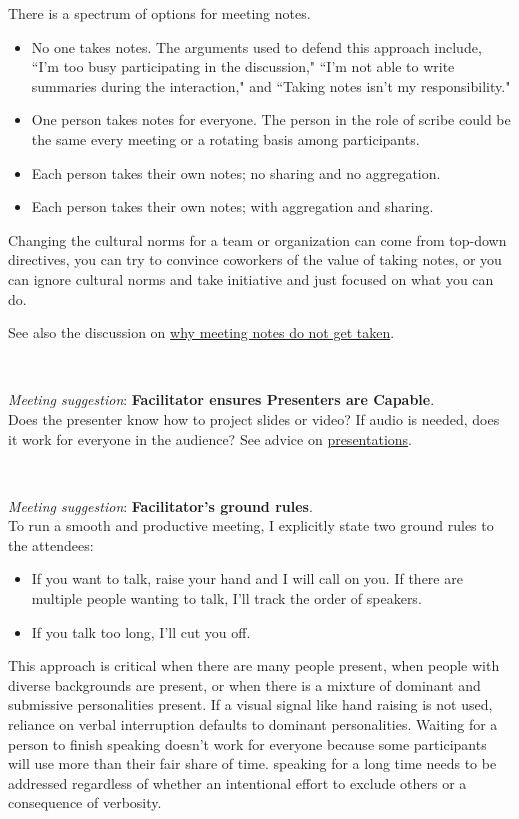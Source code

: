 There is a spectrum of options for meeting notes. 
\begin{itemize}
    \item No one takes notes. The arguments used to defend this approach include, ``I'm too busy participating in the discussion," ``I'm not able to write summaries during the interaction," and ``Taking notes isn't my responsibility."
    \item One person takes notes for everyone. The person in the role of scribe could be the same every meeting or a rotating basis among participants.
    \item Each person takes their own notes; no sharing and no aggregation.
    \item Each person takes their own notes; with aggregation and sharing.
\end{itemize}

Changing the cultural norms for a team or organization can come from top-down directives, you can try to convince coworkers of the value of taking notes, or you can ignore cultural norms and take initiative and just focused on what you can do.


See also the discussion on \hyperref[sec:written-comm-does-not-happen]{why meeting notes do not get taken}.

\ \\
\begin{samepage}
\textit{Meeting suggestion}: \textbf{Facilitator ensures Presenters are Capable}.\\
Does the presenter know how to project slides or video? If audio is needed, does it work for everyone in the audience?
See advice on \hyperref[sec:bad-presentations]{presentations}.
\end{samepage}

\ \\
\begin{samepage}
\textit{Meeting suggestion}: \textbf{Facilitator's ground rules}.\\
To run a smooth and productive meeting, I explicitly state two ground rules to the attendees:
\end{samepage}
\begin{itemize}
    \item If you want to talk, raise your hand and I will call on you. If there are multiple people wanting to talk, I'll track the order of speakers.
    \item If you talk too long, I'll cut you off. 
\end{itemize}
This approach is critical when there are many people present, when people with diverse backgrounds are present, or when there is a mixture of dominant and submissive personalities present. 
If a visual signal like hand raising is not used, reliance on verbal interruption defaults to dominant personalities. Waiting for a person to finish speaking doesn't work for everyone because some participants will use more than their fair share of time. speaking for a long time needs to be addressed regardless of whether an intentional effort to exclude others or a consequence of verbosity.

